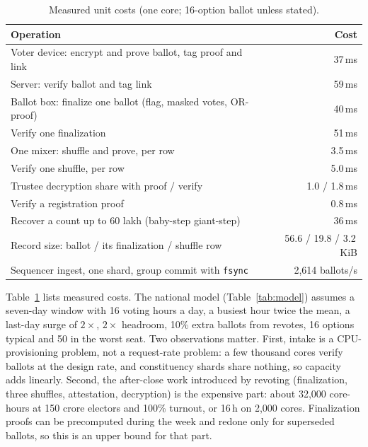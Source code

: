 \documentclass[runningheads]{llncs}
\begin{document}
\begin{table}[t]
\caption{Measured unit costs (one core; 16-option ballot unless stated).}\label{tab:unit}
\centering
\small
\begin{tabular}{@{}lr@{}}
\toprule
Operation & Cost \\
\midrule
Voter device: encrypt and prove ballot, tag proof and link & 37\,ms \\
Server: verify ballot and tag link & 59\,ms \\
Ballot box: finalize one ballot (flag, masked votes, OR-proof) & 40\,ms \\
Verify one finalization & 51\,ms \\
One mixer: shuffle and prove, per row & 3.5\,ms \\
Verify one shuffle, per row & 5.0\,ms \\
Trustee decryption share with proof / verify & 1.0 / 1.8\,ms \\
Verify a registration proof & 0.8\,ms \\
Recover a count up to 60 lakh (baby-step giant-step) & 36\,ms \\
Record size: ballot / its finalization / shuffle row & 56.6 / 19.8 / 3.2\,KiB \\
Sequencer ingest, one shard, group commit with \texttt{fsync} & 2,614 ballots/s \\
\bottomrule
\end{tabular}
\end{table}

Table~\ref{tab:unit} lists measured costs. The national model (Table~\ref{tab:model}) assumes a seven-day window with 16 voting hours a day, a busiest hour twice the mean, a last-day surge of $2\times$, $2\times$ headroom, 10\% extra ballots from revotes, 16 options typical and 50 in the worst seat. Two observations matter. First, intake is a CPU-provisioning problem, not a request-rate problem: a few thousand cores verify ballots at the design rate, and constituency shards share nothing, so capacity adds linearly. Second, the after-close work introduced by revoting (finalization, three shuffles, attestation, decryption) is the expensive part: about 32,000 core-hours at 150 crore electors and 100\% turnout, or 16\,h on 2,000 cores. Finalization proofs can be precomputed during the week and redone only for superseded ballots, so this is an upper bound for that part.
\end{document}
